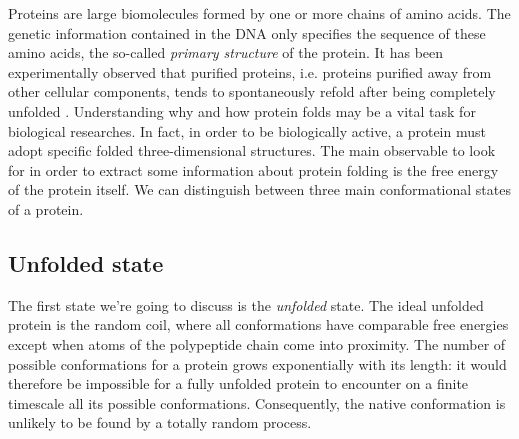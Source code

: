 Proteins are large biomolecules formed by one or more chains of amino acids.
The genetic information contained in the DNA only specifies the sequence of these amino acids, the so-called \emph{primary structure} of the protein.
It has been experimentally observed that purified proteins, i.e. proteins purified away from other cellular components, tends to spontaneously refold after being completely unfolded \cite{ProteinFolding1990}.
Understanding why and how protein folds may be a vital task for biological researches.
In fact, in order to be biologically active, a protein must adopt specific folded three-dimensional structures.
The main observable to look for in order to extract some information about protein folding is the free energy of the protein itself.
We can distinguish between three main conformational states of a protein.

\subsection{Unfolded state}
The first state we're going to discuss is the \emph{unfolded} state.
The ideal unfolded protein is the random coil, where all conformations have comparable free energies except when atoms of the polypeptide chain come into proximity.
The number of possible conformations for a protein grows exponentially with its length: it would therefore be impossible for a fully unfolded protein to encounter on a finite timescale all its possible conformations.
Consequently, the native conformation is unlikely to be found by a totally random process.

